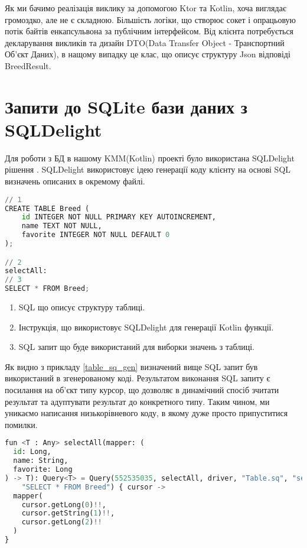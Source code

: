 Як ми бачимо реалізація виклику за допомогою Ktor та Kotlin, хоча виглядає громоздко, але не є складною.
Більшість логіки, що створює сокет і опрацьовую потік байтів енкапсульвона за публічним інтерфейсом.
Від клієнта потребується декларування викликів та дизайн DTO(Data Transfer Object - Транспортний Об'єкт Даних),
в нащому випадку це клас, що описує структуру Json відповіді BreedResult.


\section{Запити до SQLite бази даних з SQLDelight}
\label{section.2.11}
Для роботи з БД в нашому KMM(Kotlin) проекті було використана SQLDelight рішення \cite{sqldelight_home}.
SQLDelight використовує ідею генерації коду клієнту на основі SQL визначень описаних в окремому файлі.

\begin{lstlisting}[style=light, language=Python,label={lst:table_sq},caption=Table.sq]
// 1
CREATE TABLE Breed (
    id INTEGER NOT NULL PRIMARY KEY AUTOINCREMENT,
    name TEXT NOT NULL,
    favorite INTEGER NOT NULL DEFAULT 0
);

// 2
selectAll:
// 3
SELECT * FROM Breed;
\end{lstlisting}

\begin{enumerate}
    \item SQL що описує структуру таблиці.
    \item Інструкція, що використовує SQLDelight для генерації Kotlin функції.
    \item SQL запит що буде використаний для виборки значень з таблиці.
\end{enumerate}

Як видно з прикладу \ref{table_sq_gen} визначений вище SQL запит був використаний в згенерованому коді.
Результатом виконання SQL запиту є посилання на об'єкт типу курсор, що дозволяє в динамічний спосіб зчитати
результат та адуптувати результат до конкретного типу.
Таким чином, ми уникаємо написання низькорівневого коду, в якому дуже просто припуститися помилки.

\begin{lstlisting}[style=light, language=Python,label={lst:table_sq_gen},caption=Generate code]
fun <T : Any> selectAll(mapper: (
  id: Long,
  name: String,
  favorite: Long
) -> T): Query<T> = Query(552535035, selectAll, driver, "Table.sq", "selectAll",
    "SELECT * FROM Breed") { cursor ->
  mapper(
    cursor.getLong(0)!!,
    cursor.getString(1)!!,
    cursor.getLong(2)!!
  )
}
\end{lstlisting}


